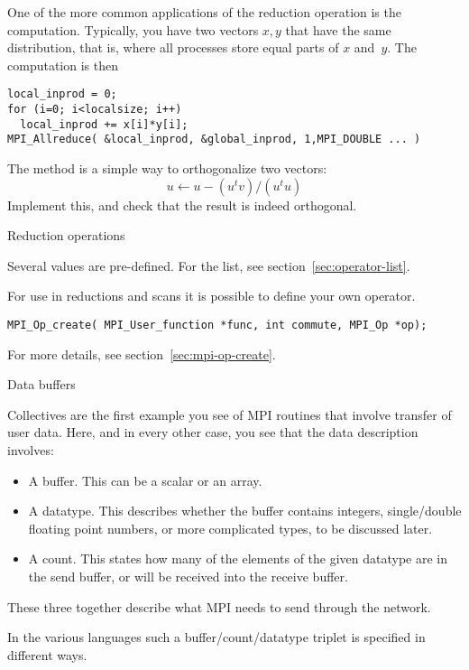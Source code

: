 One of the more common applications of the reduction operation
is the  computation. Typically, you have two vectors $x,y$
that have the same distribution, that is,
where all processes store equal parts of $x$ and~$y$.
The computation is then
\begin{lstlisting}
local_inprod = 0;
for (i=0; i<localsize; i++)
  local_inprod += x[i]*y[i];
MPI_Allreduce( &local_inprod, &global_inprod, 1,MPI_DOUBLE ... ) 
\end{lstlisting}

\begin{exercise}
  \label{ex:gramschmidt}
  The  method is a simple way to orthogonalize
  two vectors:
  \[ u \leftarrow u- (u^tv)/(u^tu) \]
  Implement this, and check that the result is indeed orthogonal.
\end{exercise}

 {Reduction operations}
\label{sec:mpi:op-reduct}

Several  values are pre-defined. For the list,
see section~\ref{sec:operator-list}.

For use in reductions and scans it is possible to define your own operator.

\begin{lstlisting}
MPI_Op_create( MPI_User_function *func, int commute, MPI_Op *op);
\end{lstlisting}

For more details, see section~\ref{sec:mpi-op-create}.

 {Data buffers}
\label{sec:mpi-buffers}

Collectives are the first example you see of MPI routines that
involve transfer of user data. Here, and in every other case,
you see that the data description involves:
\begin{itemize}
\item A buffer. This can be a scalar or an array.
\item A datatype. This describes whether the buffer contains integers,
  single/double floating point numbers, or more complicated types, to
  be discussed later.
\item A count. This states how many of the elements of the given
  datatype are in the send buffer, or will be received into the receive buffer.
\end{itemize}
These three together describe what MPI needs to send through the network.

In the various languages such a buffer/count/datatype triplet is specified in
different ways.

